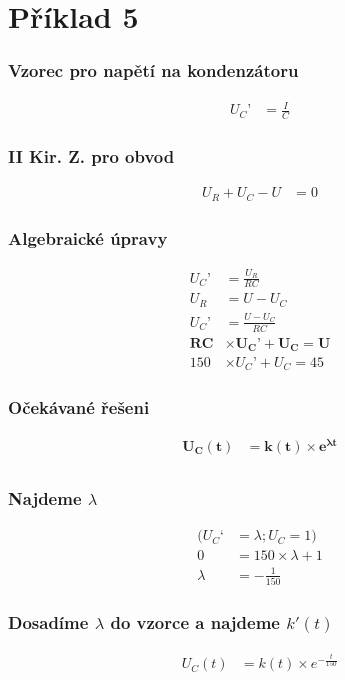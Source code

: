 \section{Příklad 5}
\subsubsection{Vzorec pro napětí na kondenzátoru}
\begin{align*}
U_C’ &= \frac{I}{C}
\end{align*}
\subsubsection{II Kir. Z. pro obvod}
\begin{align*}
U_R + U_C - U &= 0
\end{align*}
\subsubsection{Algebraické úpravy}
\begin{align*}
U_C’ &= \frac{U_R}{RC}\\
U_R &= U - U_C\\
U_C’ &= \frac{U - U_C}{RC}\\
\boldsymbol{RC}&\times \boldsymbol{U_C’ + U_C = U}\\
150 &\times  U_C’ + U_C = 45
\end{align*}
\subsubsection{Očekávané řešeni}
\begin{align*}
\boldsymbol{U_C(t) }&=\boldsymbol{ k(t) \times  e^{\lambda t} }\\
\end{align*}
\subsubsection{Najdeme $\lambda$}
\begin{align*}
(U_C‘ &= \lambda; U_C = 1)\\
0 &= 150\times \lambda + 1\\
\lambda &= - \frac{1}{150}
\end{align*}
\subsubsection{Dosadíme $\lambda$ do vzorce a najdeme $k'(t)$}
\begin{align*}
U_C(t) &= k(t) \times  e^{-\frac{t}{150} }
\end{align*}
